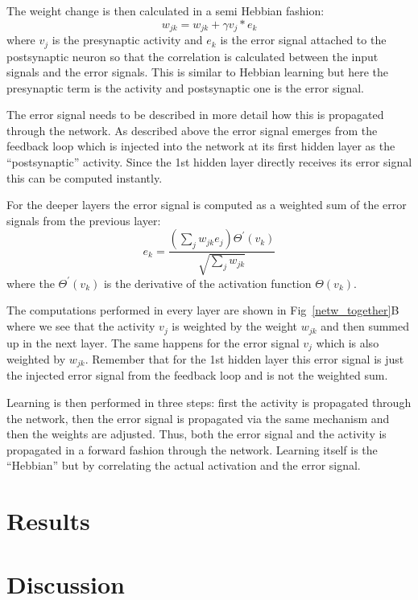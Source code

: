\documentclass{llncs}
\begin{document}
The weight change is then calculated in a semi Hebbian fashion:
\begin{equation}
  w_{jk} = w_{jk} + \gamma v_j * e_k
\end{equation}
where $v_j$ is the presynaptic activity and $e_k$ is the error signal
attached to the postsynaptic neuron so that the correlation is
calculated between the input signals and the error signals. This is similar
to Hebbian learning but here the presynaptic term is the activity
and postsynaptic one is the error signal.

The error signal needs to be described in more detail how this
is propagated through the network. As described above the error
signal emerges from the feedback loop which is injected into the
network at its first hidden layer as the ``postsynaptic'' activity.
Since the 1st hidden layer directly receives its error signal this
can be computed instantly.

For the deeper layers the error signal is computed as a weighted
sum of the error signals from the previous layer:
\begin{equation}
  e_k = \frac{\left( \sum_j w_{jk} e_{j} \right) \Theta^\prime (v_k) }{\sqrt{\sum_j w_{jk}}}
\end{equation}
where the $\Theta^\prime (v_k)$ is the derivative of the activation
function $\Theta(v_k)$.

The computations performed in every layer are shown in
Fig~\ref{netw_together}B where we see that the activity $v_j$ is
weighted by the weight $w_{jk}$ and then summed up in the next
layer. The same happens for the error signal $v_j$ which is also
weighted by $w_{jk}$. Remember that for the 1st hidden layer this
error signal is just the injected error signal from the feedback loop
and is not the weighted sum.

Learning is then performed in three steps: first the activity is propagated through
the network, then the error signal is propagated via the same mechanism and then the
weights are adjusted. Thus, both the error
signal and the activity is propagated in a forward fashion through the network.
Learning itself is the ``Hebbian'' but by correlating the actual activation
and the error signal. 



\section{Results}

\section{Discussion}




\end{document}
